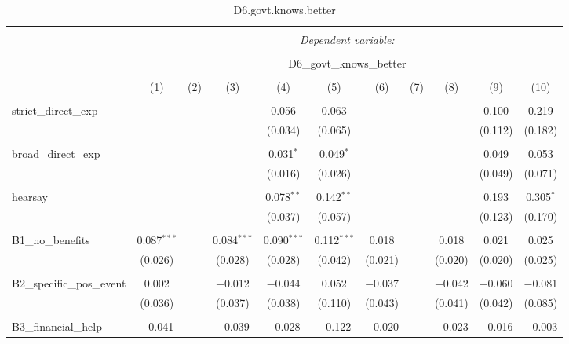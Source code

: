 
\begin{table}[H] \centering 
  \caption{D6.govt.knows.better} 
  \label{} 
\tiny 
\begin{tabular}{@{\extracolsep{4pt}}lcccccccccc} 
\\[-1.8ex]\hline 
\hline \\[-1.8ex] 
 & \multicolumn{10}{c}{\textit{Dependent variable:}} \\ 
\cline{2-11} 
\\[-1.8ex] & \multicolumn{10}{c}{D6\_govt\_knows\_better} \\ 
\\[-1.8ex] & (1) & (2) & (3) & (4) & (5) & (6) & (7) & (8) & (9) & (10)\\ 
\hline \\[-1.8ex] 
 strict\_direct\_exp &  &  &  & 0.056 & 0.063 &  &  &  & 0.100 & 0.219 \\ 
  &  &  &  & (0.034) & (0.065) &  &  &  & (0.112) & (0.182) \\ 
  & & & & & & & & & & \\ 
 broad\_direct\_exp &  &  &  & 0.031$^{*}$ & 0.049$^{*}$ &  &  &  & 0.049 & 0.053 \\ 
  &  &  &  & (0.016) & (0.026) &  &  &  & (0.049) & (0.071) \\ 
  & & & & & & & & & & \\ 
 hearsay &  &  &  & 0.078$^{**}$ & 0.142$^{**}$ &  &  &  & 0.193 & 0.305$^{*}$ \\ 
  &  &  &  & (0.037) & (0.057) &  &  &  & (0.123) & (0.170) \\ 
  & & & & & & & & & & \\ 
 B1\_no\_benefits & 0.087$^{***}$ &  & 0.084$^{***}$ & 0.090$^{***}$ & 0.112$^{***}$ & 0.018 &  & 0.018 & 0.021 & 0.025 \\ 
  & (0.026) &  & (0.028) & (0.028) & (0.042) & (0.021) &  & (0.020) & (0.020) & (0.025) \\ 
  & & & & & & & & & & \\ 
 B2\_specific\_pos\_event & 0.002 &  & $-$0.012 & $-$0.044 & 0.052 & $-$0.037 &  & $-$0.042 & $-$0.060 & $-$0.081 \\ 
  & (0.036) &  & (0.037) & (0.038) & (0.110) & (0.043) &  & (0.041) & (0.042) & (0.085) \\ 
  & & & & & & & & & & \\ 
 B3\_financial\_help & $-$0.041 &  & $-$0.039 & $-$0.028 & $-$0.122 & $-$0.020 &  & $-$0.023 & $-$0.016 & $-$0.003 \\ 

\end{tabular}
\end{table}
